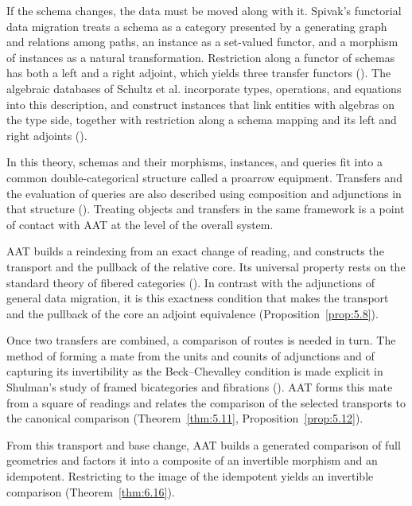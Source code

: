 If the schema changes, the data must be moved along with it.
Spivak's functorial data migration treats a schema as a category presented by a generating
graph and relations among paths, an instance as a set-valued functor, and a morphism of
instances as a natural transformation. Restriction along a functor of schemas has both a
left and a right adjoint, which yields three transfer functors
(\cite[\href{https://arxiv.org/pdf/1009.1166v3}{\S\S3.2, 3.4--3.5, 4, Propositions 4.2.1, 4.3.1}]{Spivak12}).
The algebraic databases of Schultz et al. incorporate types, operations, and equations into
this description, and construct instances that link entities with algebras on the type side,
together with restriction along a schema mapping and its left and right adjoints
(\cite[\href{https://arxiv.org/pdf/1602.03501v3}{\S\S6--7, especially \S6.19, Propositions 7.3--7.4}]{SSVW17}).

In this theory, schemas and their morphisms, instances, and queries fit into a common
double-categorical structure called a proarrow equipment. Transfers and the evaluation of
queries are also described using composition and adjunctions in that structure
(\cite[\href{https://arxiv.org/pdf/1602.03501v3}{Definition 8.13, Proposition 8.14, Lemma 8.18, \S\S8.25--8.26, 9}]{SSVW17}).
Treating objects and transfers in the same framework is a point of contact with AAT at
the level of the overall system.

AAT builds a reindexing from an exact change of reading, and constructs the transport and
the pullback of the relative core.
Its universal property rests on the standard theory of fibered categories
(\cite[\href{https://stacks.math.columbia.edu/tag/02XJ}{Tag 02XJ}]{Stacks}).
In contrast with the adjunctions of general data migration, it is this exactness condition
that makes the transport and the pullback of the core an adjoint equivalence
(Proposition~\ref{prop:5.8}).

Once two transfers are combined, a comparison of routes is needed in turn.
The method of forming a mate from the units and counits of adjunctions and of capturing its
invertibility as the Beck--Chevalley condition is made explicit in Shulman's study of framed
bicategories and fibrations
(\cite[\href{https://tac.mta.ca/tac/volumes/20/18/20-18.pdf}{\S13, Definition 13.11}]{Shulman08}).
AAT forms this mate from a square of readings and relates the comparison of the
selected transports to the canonical comparison
(Theorem~\ref{thm:5.11}, Proposition~\ref{prop:5.12}).

From this transport and base change, AAT builds a generated comparison of full
geometries and factors it into a composite of an invertible morphism and an idempotent.
Restricting to the image of the idempotent yields an invertible comparison
(Theorem~\ref{thm:6.16}).

